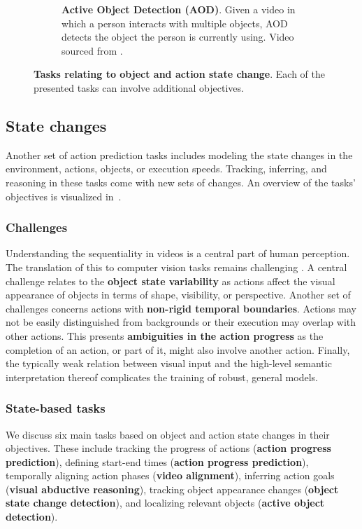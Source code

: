 \begin{figure}[t]
\begin{subfigure}{\linewidth}
\caption{\textbf{Active Object Detection (AOD)}. Given a video in which a person interacts with multiple objects, AOD detects the object the person is currently using. Video sourced from .}
\label{fig:states::aod}
\end{subfigure}
\caption{\textbf{Tasks relating to object and action state change}. Each of the presented tasks can involve additional objectives.}
\label{fig:state_changes}
\end{figure}


\subsection{State changes}
\label{sec:prediction::states}

Another set of action prediction tasks includes modeling the state changes in the environment, actions, objects, or execution speeds. Tracking, inferring, and reasoning in these tasks come with new sets of changes. An overview of the tasks' objectives is visualized in~.

\subsubsection{Challenges}
\label{sec:prediction::states::challenges}


Understanding the sequentiality in videos is a central part of human perception. The translation of this to computer vision tasks remains challenging . A central challenge relates to the \textbf{object state variability} as actions affect the visual appearance of objects in terms of shape, visibility, or perspective. Another set of challenges concerns actions with \textbf{non-rigid temporal boundaries}. Actions may not be easily distinguished from backgrounds or their execution may overlap with other actions. This presents \textbf{ambiguities in the action progress} as the completion of an action, or part of it, might also involve another action. Finally, the typically weak relation between visual input and the high-level semantic interpretation thereof complicates the training of robust, general models.


\subsubsection{State-based tasks}
\label{sec:prediction::states:::state_tasks}


We discuss six main tasks based on object and action state changes in their objectives. These include tracking the progress of actions (\textbf{action progress prediction}), defining start-end times (\textbf{action progress prediction}), temporally aligning action phases (\textbf{video alignment}), inferring action goals (\textbf{visual abductive reasoning}), tracking object appearance changes (\textbf{object state change detection}), and localizing relevant objects (\textbf{active object detection}).

